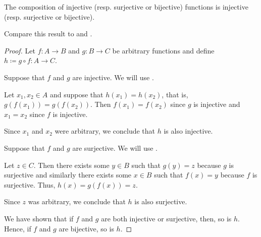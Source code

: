\begin{proposition}\label{thm:function_composition_invertibility}
  The composition of injective (resp. surjective or bijective) functions is injective (resp. surjective or bijective).

  Compare this result to  and .
\end{proposition}
\begin{proof}
  Let \( f: A \to B \) and \( g: B \to C \) be arbitrary functions and define \( h \coloneqq g \circ f: A \to C \).

   Suppose that \( f \) and \( g \) are injective. We will use .

  Let \( x_1, x_2 \in A \) and suppose that \( h(x_1) = h(x_2) \), that is, \( g(f(x_1)) = g(f(x_2)) \). Then \( f(x_1) = f(x_2) \) since \( g \) is injective and \( x_1 = x_2 \) since \( f \) is injective.

  Since \( x_1 \) and \( x_2 \) were arbitrary, we conclude that \( h \) is also injective.

   Suppose that \( f \) and \( g \) are surjective. We will use .

  Let \( z \in C \). Then there exists some \( y \in B \) such that \( g(y) = z \) because \( g \) is surjective and similarly there exists some \( x \in B \) such that \( f(x) = y \) because \( f \) is surjective. Thus, \( h(x) = g(f(x)) = z \).

  Since \( z \) was arbitrary, we conclude that \( h \) is also surjective.

   We have shown that if \( f \) and \( g \) are both injective or surjective, then, so is \( h \). Hence, if \( f \) and \( g \) are bijective, so is \( h \).
\end{proof}

